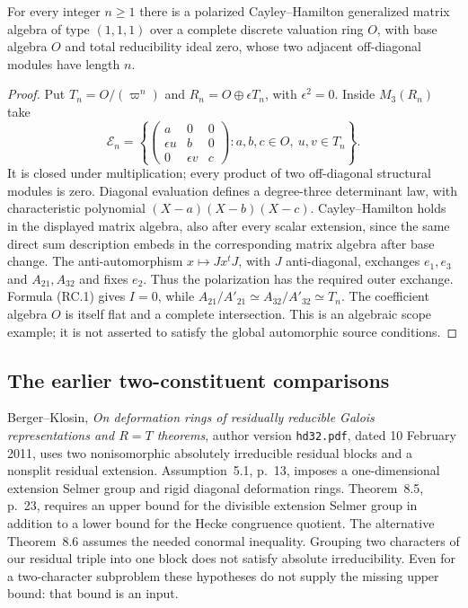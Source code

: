 \begin{lemma}
For every integer $n\geq1$ there is a polarized
Cayley--Hamilton generalized matrix algebra of type $(1,1,1)$
over a complete discrete valuation ring $O$, with base
algebra $O$ and total reducibility ideal zero, whose two
adjacent off-diagonal modules have length $n$.
\end{lemma}
\begin{proof}
Put $T_n=O/(\varpi^n)$ and
$R_n=O\oplus\epsilon T_n$, with $\epsilon^2=0$.
Inside $M_3(R_n)$ take
\[
 \mathcal E_n=
 \left\{
 \begin{pmatrix}
 a&0&0\\ \epsilon u&b&0\\0&\epsilon v&c
 \end{pmatrix}:
 a,b,c\in O,\ u,v\in T_n\right\}.                       \tag{RC.3}
\]
It is closed under multiplication; every product of two
off-diagonal structural modules is zero.  Diagonal
evaluation defines a degree-three determinant law, with
characteristic polynomial $(X-a)(X-b)(X-c)$.
Cayley--Hamilton holds in the displayed matrix algebra,
also after every scalar extension, since the same direct
sum description embeds in the corresponding matrix
algebra after base change.  The anti-automorphism
$x\mapsto Jx^tJ$, with $J$ anti-diagonal, exchanges
$e_1,e_3$ and $A_{21},A_{32}$ and fixes $e_2$.
Thus the polarization has the required outer exchange.
Formula (RC.1) gives $I=0$, while
$A_{21}/A'_{21}\simeq A_{32}/A'_{32}\simeq T_n$.
The coefficient algebra $O$ is itself flat and a complete
intersection.  This is an algebraic scope example; it is
not asserted to satisfy the global automorphic source
conditions.
\end{proof}

\subsection{The earlier two-constituent comparisons}

Berger--Klosin, \emph{On deformation rings of residually
reducible Galois representations and $R=T$ theorems},
author version \texttt{hd32.pdf}, dated 10 February 2011,
uses two nonisomorphic absolutely irreducible residual
blocks and a nonsplit residual extension.  Assumption~5.1,
p.~13, imposes a one-dimensional extension Selmer group
and rigid diagonal deformation rings.  Theorem~8.5,
p.~23, requires an upper bound for the divisible extension
Selmer group in addition to a lower bound for the Hecke
congruence quotient.  The alternative Theorem~8.6 assumes
the needed conormal inequality.  Grouping two characters
of our residual triple into one block does not satisfy
absolute irreducibility.  Even for a two-character
subproblem these hypotheses do not supply the missing
upper bound: that bound is an input.

